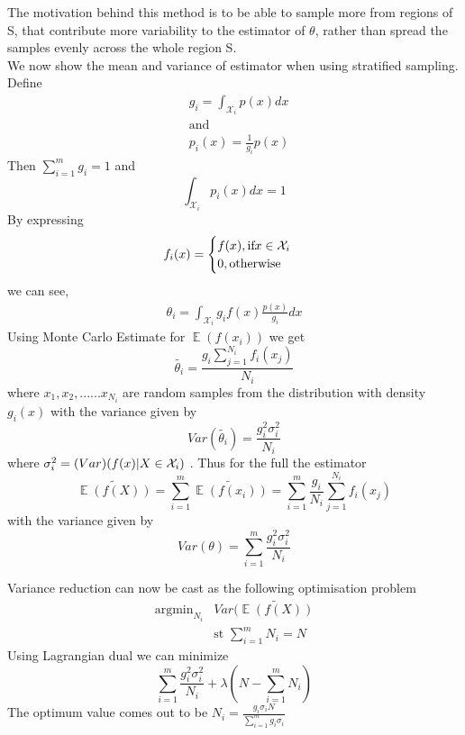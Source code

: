 \documentclass[a4paper,twoside]{iiththesis}
\theoremstyle{definition}
\theoremstyle{definition}
\theoremstyle{remark}
\DeclareMathOperator*{\E}{\mathop{\mathbb{E}}}
\begin{document}
The motivation behind this method is to be able to sample more from regions of S, that contribute more variability to the estimator of $\theta$, rather than spread the samples evenly across the whole region S. \\
We now show the mean and variance of estimator when using stratified sampling. 
Define 
	\begin{align}
	&g_i = \int_{\mathcal{X}_i} p(x) dx \\
    & \text{and} \\
    & p_i(x) = \frac{1}{g_i} p(x)
	\end{align}
    Then $\sum_{i=1}^m g_i =1$ and 
    \begin{equation}
    \int_{\mathcal{X}_i} p_i (x) dx = 1
    \end{equation}
By expressing 
\begin{equation}
f_i(x) = 
\begin{cases}
f(x), \space \text{if} \space x \in \mathcal{X}_i \\ 
				0, \text{otherwise}
\end{cases}
\end{equation}
we can see,
\begin{align}
	\theta_i = \int_{\mathcal{X}_i} g_i f(x) \frac{p(x)}{g_i} dx
\end{align}
Using Monte Carlo Estimate for $\E(f(x_i))$ we get 
\begin{equation}
			\tilde{\theta_i} = \frac{g_i \sum_{j=1}^{N_i} f_i(x_j)} {N_i}
\end{equation}
where $x_1, x_2, ...... x_{N_i}$ are random samples from the distribution with density $g_i(x)$ with the variance given by 
\begin{equation}
	Var(\tilde{\theta_i}) = \frac{g_{i}^2 \sigma_{i}^2} {N_i}
\end{equation}
where $\sigma_{i}^2 = \text(Var) (f(x) | X \in \mathcal{X}_i)$ . Thus for the full the estimator 
\begin{equation}
\tilde{\E(f(X))} = \sum_{i=1}^m \tilde{\E(f(x_i))} = \sum_{i=1}^m \frac{g_i} {N_i} \sum_{j=1}^{N_i} f_i(x_j)
\end{equation}
with the variance given by 
\begin{equation}
Var(\theta) = \sum_{i=1}^m \frac{g_{i}^2 \sigma_{i}^2} {N_i}
\end{equation}

Variance reduction can now be cast as the following optimisation problem
\begin{align}
\text{argmin}_{N_i} &Var(\tilde{\E(f(X))}\\
&\text{st } \sum_{i=1}^m N_i = N
\end{align}
Using Lagrangian dual we can minimize 
\begin{equation}
\sum_{i=1}^m \frac{g_{i}^2 \sigma_{i}^2 } {N_i} + \lambda (N - \sum_{i=1}^m N_i)
\end{equation}
The optimum value comes out to be $N_i = \frac{g_i{\sigma_i}N }{\sum_{i=1}^m g_i{\sigma_i}}$
\end{document}
